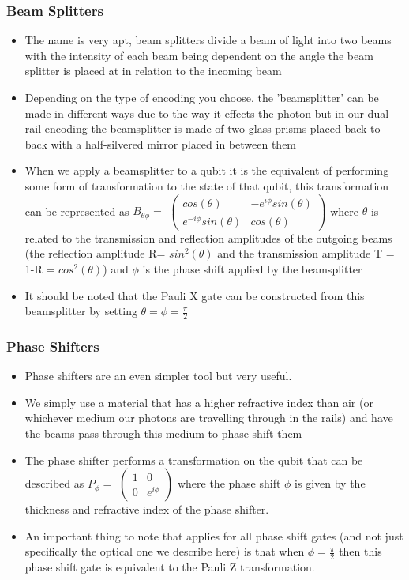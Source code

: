 \subsubsection{Beam Splitters}
\begin{itemize}
    \item The name is very apt, beam splitters divide a beam of light into two beams with the intensity of each beam being dependent on the angle the beam splitter is placed at in relation to the incoming beam
    \item Depending on the type of encoding you choose, the 'beamsplitter' can be made in different ways due to the way it effects the photon but in our dual rail encoding the beamsplitter is made of two glass prisms placed back to back with a half-silvered mirror placed in between them %
    \item When we apply a beamsplitter to a qubit it is the equivalent of performing some form of transformation to the state of that qubit, this transformation can be represented as $B_{\theta\phi} = $ $\begin{pmatrix}
    cos(\theta) & -e^{i\phi}sin(\theta) \\
    e^{-i\phi}sin(\theta) & cos(\theta) 
    \end{pmatrix}$ where $\theta$ is related to the transmission and reflection amplitudes of the outgoing beams (the reflection amplitude R= $sin^2(\theta)$ and the transmission amplitude T = 1-R = $cos^2(\theta)$) and $\phi$ is the phase shift applied by the beamsplitter
    \item It should be noted that the Pauli X gate can be constructed from this beamsplitter by setting $\theta = \phi = \frac{\pi}{2}$
    
\end{itemize}
\subsubsection{Phase Shifters}
\begin{itemize}
    \item Phase shifters are an even simpler tool but very useful. 
    \item We simply use a material that has a higher refractive index than air (or whichever medium our photons are travelling through in the rails) and have the beams pass through this medium to phase shift them
    \item The phase shifter performs a transformation on the qubit that can be described as $P_\phi = $ $\begin{pmatrix}
    1 & 0 \\
    0 & e^{i\phi}
    \end{pmatrix}$ where the phase shift $\phi$ is given by the thickness and refractive index of the phase shifter.
    \item An important thing to note that applies for all phase shift gates (and not just specifically the optical one we describe here) is that when $\phi = \frac{\pi}{2}$ then this phase shift gate is equivalent to the Pauli Z transformation.
\end{itemize}
